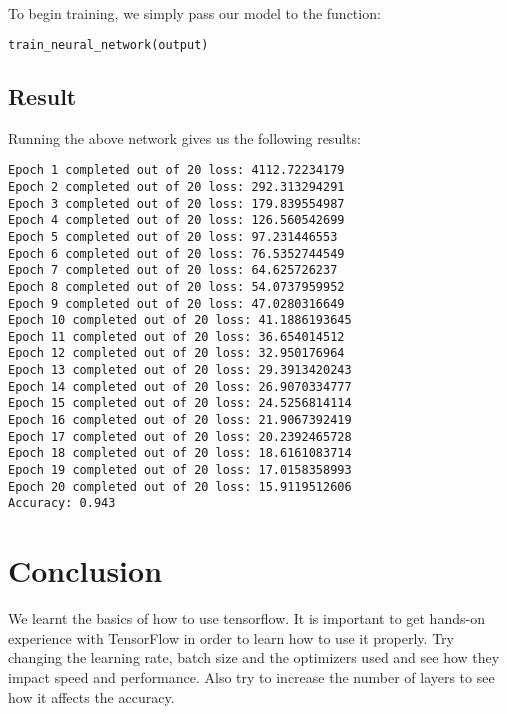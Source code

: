 \documentclass[Proceedings]{ascelike}
\begin{document}
To begin training, we simply pass our model to the function:

\begin{lstlisting}[language=Python]
train_neural_network(output)
\end{lstlisting}

\subsection{Result}
Running the above network gives us the following results:

\begin{lstlisting}
Epoch 1 completed out of 20 loss: 4112.72234179
Epoch 2 completed out of 20 loss: 292.313294291
Epoch 3 completed out of 20 loss: 179.839554987
Epoch 4 completed out of 20 loss: 126.560542699
Epoch 5 completed out of 20 loss: 97.231446553
Epoch 6 completed out of 20 loss: 76.5352744549
Epoch 7 completed out of 20 loss: 64.625726237
Epoch 8 completed out of 20 loss: 54.0737959952
Epoch 9 completed out of 20 loss: 47.0280316649
Epoch 10 completed out of 20 loss: 41.1886193645
Epoch 11 completed out of 20 loss: 36.654014512
Epoch 12 completed out of 20 loss: 32.950176964
Epoch 13 completed out of 20 loss: 29.3913420243
Epoch 14 completed out of 20 loss: 26.9070334777
Epoch 15 completed out of 20 loss: 24.5256814114
Epoch 16 completed out of 20 loss: 21.9067392419
Epoch 17 completed out of 20 loss: 20.2392465728
Epoch 18 completed out of 20 loss: 18.6161083714
Epoch 19 completed out of 20 loss: 17.0158358993
Epoch 20 completed out of 20 loss: 15.9119512606
Accuracy: 0.943
\end{lstlisting}

\section{Conclusion}
We learnt the basics of how to use tensorflow. It is important to get hands-on experience with TensorFlow in order to learn how to use it properly. Try changing the learning rate, batch size and the optimizers used and see how they impact speed and performance.
Also try to increase the number of layers to see how it affects the accuracy.
\end{document}
